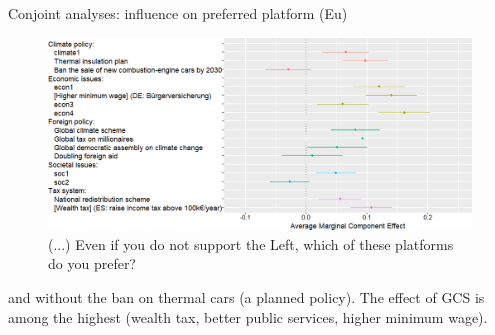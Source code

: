 \begin{framefont}{\small}
\begin{frame}{Conjoint analyses: influence on preferred platform (Eu)\label{}} 
    \begin{figure}\vspace{-.2cm}
        \centering 
        \caption{%
		(...) Even if you do not support the Left, which of these platforms do you prefer? 
		}
        \vspace{-.2cm} 
        \includegraphics[height=.7\textheight]{../figures/EU/ca_r.png} 
    \end{figure}
    \bbvs \ip {} and without the ban on thermal cars (a planned policy).
	\ip The effect of GCS is among the highest (wealth tax, better public services, higher minimum wage).
    \ee
\end{frame}


\end{framefont}
